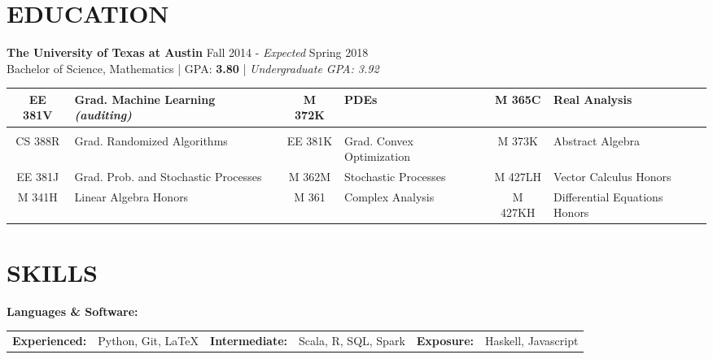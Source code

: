 \documentclass{resume}
\begin{document}
\maketitle

\section{EDUCATION} 
\textbf{The University of Texas at Austin} \hfill {\small Fall 2014 - \emph{Expected} Spring 2018}\\
Bachelor of Science, Mathematics | GPA: \textbf{3.80} | \emph{Undergraduate GPA: 3.92}
\vspace{1mm}                       %

\begin{adjustbox}{width=1\textwidth}
\begin{tabular}{c l c l c l}
EE 381V & Grad. Machine Learning \emph{(auditing)} & M 372K & PDEs & M 365C & Real Analysis \\
\hline \vspace{-1em}\\ 
CS 388R & Grad. Randomized Algorithms & EE 381K & Grad. Convex Optimization & M 373K & Abstract Algebra\\
EE 381J & Grad. Prob. and Stochastic Processes & M 362M & Stochastic Processes& M 427LH & Vector Calculus Honors \\
M 341H & Linear Algebra Honors & M 361 & Complex Analysis & M 427KH & Differential Equations Honors\\
\end{tabular}
\end{adjustbox}

\section{SKILLS}
\textbf{Languages \& Software:}

\begin{adjustbox}{width=1\textwidth}
\begin{tabular}{l l r l r l}
\textbf{Experienced:} & Python, Git, \LaTeX & \textbf{Intermediate:} & Scala, R, SQL, Spark &
\textbf{Exposure:} & Haskell, Javascript 
\end{tabular}
\end{adjustbox} 
\end{document}
